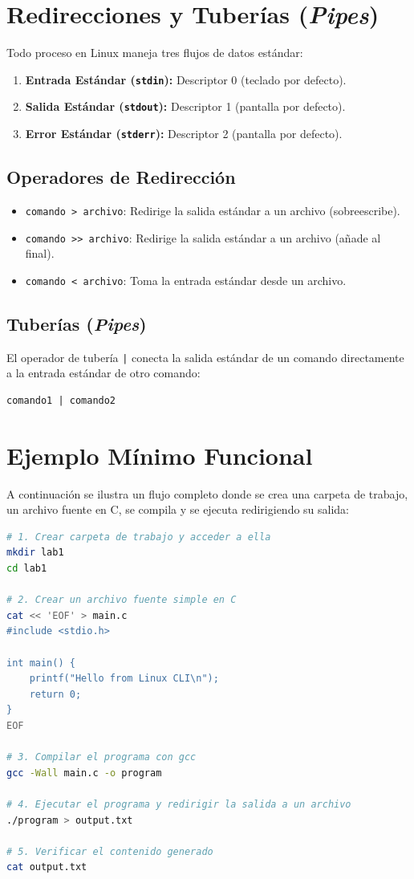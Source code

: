 \documentclass[12pt,a4paper]{article}
\begin{document}
\section{Redirecciones y Tuberías (\textit{Pipes})}
Todo proceso en Linux maneja tres flujos de datos estándar:
\begin{enumerate}
    \item \textbf{Entrada Estándar (\texttt{stdin}):} Descriptor 0 (teclado por defecto).
    \item \textbf{Salida Estándar (\texttt{stdout}):} Descriptor 1 (pantalla por defecto).
    \item \textbf{Error Estándar (\texttt{stderr}):} Descriptor 2 (pantalla por defecto).
\end{enumerate}

\subsection{Operadores de Redirección}
\begin{itemize}
    \item \texttt{comando > archivo}: Redirige la salida estándar a un archivo (sobreescribe).
    \item \texttt{comando >> archivo}: Redirige la salida estándar a un archivo (añade al final).
    \item \texttt{comando < archivo}: Toma la entrada estándar desde un archivo.
\end{itemize}

\subsection{Tuberías (\textit{Pipes})}
El operador de tubería \texttt{|} conecta la salida estándar de un comando directamente a la entrada estándar de otro comando:
\begin{lstlisting}[numbers=none]
comando1 | comando2
\end{lstlisting}

\Needspace{10cm}
\section{Ejemplo Mínimo Funcional}
A continuación se ilustra un flujo completo donde se crea una carpeta de trabajo, un archivo fuente en C, se compila y se ejecuta redirigiendo su salida:

\begin{lstlisting}[language=bash]
# 1. Crear carpeta de trabajo y acceder a ella
mkdir lab1
cd lab1

# 2. Crear un archivo fuente simple en C
cat << 'EOF' > main.c
#include <stdio.h>

int main() {
    printf("Hello from Linux CLI\n");
    return 0;
}
EOF

# 3. Compilar el programa con gcc
gcc -Wall main.c -o program

# 4. Ejecutar el programa y redirigir la salida a un archivo
./program > output.txt

# 5. Verificar el contenido generado
cat output.txt
\end{lstlisting}
\end{document}
